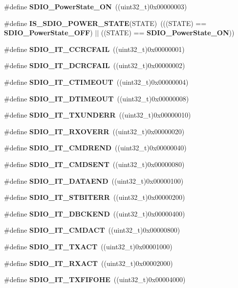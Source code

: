 \begin{DoxyCompactItemize}
\item 
\#define \textbf{ S\+D\+I\+O\+\_\+\+Power\+State\+\_\+\+ON}~((uint32\+\_\+t)0x00000003)
\item 
\#define \textbf{ I\+S\+\_\+\+S\+D\+I\+O\+\_\+\+P\+O\+W\+E\+R\+\_\+\+S\+T\+A\+TE}(S\+T\+A\+TE)~(((S\+T\+A\+TE) == \textbf{ S\+D\+I\+O\+\_\+\+Power\+State\+\_\+\+O\+FF}) $\vert$$\vert$ ((S\+T\+A\+TE) == \textbf{ S\+D\+I\+O\+\_\+\+Power\+State\+\_\+\+ON}))
\item 
\#define \textbf{ S\+D\+I\+O\+\_\+\+I\+T\+\_\+\+C\+C\+R\+C\+F\+A\+IL}~((uint32\+\_\+t)0x00000001)
\item 
\#define \textbf{ S\+D\+I\+O\+\_\+\+I\+T\+\_\+\+D\+C\+R\+C\+F\+A\+IL}~((uint32\+\_\+t)0x00000002)
\item 
\#define \textbf{ S\+D\+I\+O\+\_\+\+I\+T\+\_\+\+C\+T\+I\+M\+E\+O\+UT}~((uint32\+\_\+t)0x00000004)
\item 
\#define \textbf{ S\+D\+I\+O\+\_\+\+I\+T\+\_\+\+D\+T\+I\+M\+E\+O\+UT}~((uint32\+\_\+t)0x00000008)
\item 
\#define \textbf{ S\+D\+I\+O\+\_\+\+I\+T\+\_\+\+T\+X\+U\+N\+D\+E\+RR}~((uint32\+\_\+t)0x00000010)
\item 
\#define \textbf{ S\+D\+I\+O\+\_\+\+I\+T\+\_\+\+R\+X\+O\+V\+E\+RR}~((uint32\+\_\+t)0x00000020)
\item 
\#define \textbf{ S\+D\+I\+O\+\_\+\+I\+T\+\_\+\+C\+M\+D\+R\+E\+ND}~((uint32\+\_\+t)0x00000040)
\item 
\#define \textbf{ S\+D\+I\+O\+\_\+\+I\+T\+\_\+\+C\+M\+D\+S\+E\+NT}~((uint32\+\_\+t)0x00000080)
\item 
\#define \textbf{ S\+D\+I\+O\+\_\+\+I\+T\+\_\+\+D\+A\+T\+A\+E\+ND}~((uint32\+\_\+t)0x00000100)
\item 
\#define \textbf{ S\+D\+I\+O\+\_\+\+I\+T\+\_\+\+S\+T\+B\+I\+T\+E\+RR}~((uint32\+\_\+t)0x00000200)
\item 
\#define \textbf{ S\+D\+I\+O\+\_\+\+I\+T\+\_\+\+D\+B\+C\+K\+E\+ND}~((uint32\+\_\+t)0x00000400)
\item 
\#define \textbf{ S\+D\+I\+O\+\_\+\+I\+T\+\_\+\+C\+M\+D\+A\+CT}~((uint32\+\_\+t)0x00000800)
\item 
\#define \textbf{ S\+D\+I\+O\+\_\+\+I\+T\+\_\+\+T\+X\+A\+CT}~((uint32\+\_\+t)0x00001000)
\item 
\#define \textbf{ S\+D\+I\+O\+\_\+\+I\+T\+\_\+\+R\+X\+A\+CT}~((uint32\+\_\+t)0x00002000)
\item 
\#define \textbf{ S\+D\+I\+O\+\_\+\+I\+T\+\_\+\+T\+X\+F\+I\+F\+O\+HE}~((uint32\+\_\+t)0x00004000)
\item 
$$
\end{DoxyCompactItemize}
